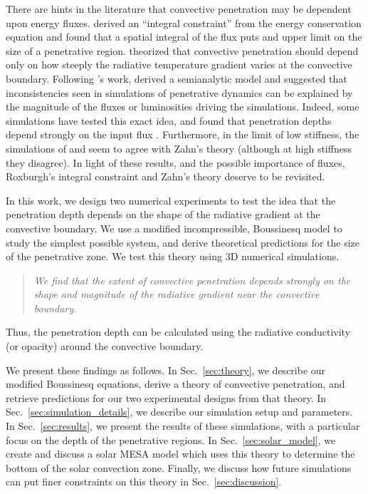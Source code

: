\documentclass[twocolumn]{aastex631}
\begin{document}
There are hints in the literature that convective penetration may be dependent upon energy fluxes.
\citet{roxburgh1978, roxburgh1989, roxburgh1992, roxburgh1998} derived an ``integral constraint'' from the energy conservation equation and found that a spatial integral of the flux puts and upper limit on the size of a penetrative region.
\citet{zahn1991} theorized that convective penetration should depend only on how steeply the radiative temperature gradient varies at the convective boundary.
Following \citet{zahn1991}'s work, \citet{rempel2004} derived a semianalytic model and suggested that inconsistencies seen in simulations of penetrative dynamics can be explained by the magnitude of the fluxes or luminosities driving the simulations.
Indeed, some simulations have tested this exact idea, and found that penetration depths depend strongly on the input flux \citep{singh_etal_1998, kapyla_etal_2007, tian_etal_2009, hotta2017, kapyla2019}.
Furthermore, in the limit of low stiffness, the simulations of \citet{hurlburt_etal_1994} and \citet{rogers_etal_2006} seem to agree with Zahn's theory (although at high stiffness they disagree).
In light of these results, and the possible importance of fluxes, Roxburgh's integral constraint and Zahn's theory deserve to be revisited.

In this work, we design two numerical experiments to test the idea that the penetration depth depends on the shape of the radiative gradient at the convective boundary.
We use a modified incompressible, Boussinesq model to study the simplest possible system, and derive theoretical predictions for the size of the penetrative zone.
We test this theory using 3D numerical simulations.
\begin{quote}
\emph{
We find that the extent of convective penetration depends strongly on the shape and magnitude of the radiative gradient near the convective boundary.
}
\end{quote}
Thus, the penetration depth can be calculated using the radiative conductivity (or opacity) around the convective boundary.

We present these findings as follows.
In Sec.~\ref{sec:theory}, we describe our modified Boussinesq equations, derive a theory of convective penetration, and retrieve predictions for our two experimental designs from that theory.
In Sec.~\ref{sec:simulation_details}, we describe our simulation setup and parameters.
In Sec.~\ref{sec:results}, we present the results of these simulations, with a particular focus on the depth of the penetrative regions.
In Sec.~\ref{sec:solar_model}, we create and discuss a solar MESA model which uses this theory to determine the bottom of the solar convection zone.
Finally, we discuss how future simulations can put finer constraints on this theory in Sec.~\ref{sec:discussion}.
\end{document}
